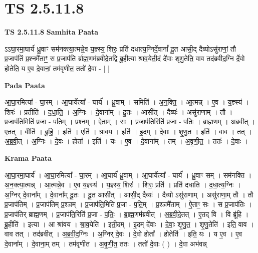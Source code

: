 \documentclass[17pt]{extarticle}
\begin{document}
\section{ TS 2.5.11.8 }

\textbf{TS 2.5.11.8 } \newline
\textbf{Samhita Paata} \newline

ऽऽघा॒रमा॒घार्य॑ ध्रु॒वाꣳ सम॑नक्त्या॒त्मन्ने॒व य॒ज्ञ्स्य॒ शिरः॒ प्रति॑ दधात्य॒ग्निर्दे॒वानां᳚ दू॒त आसी॒द् दैव्योऽसु॑राणां॒ तौ प्र॒जाप॑तिं प्र॒श्नमै॑ताꣳ॒॒ स प्र॒जाप॑ति र्ब्राह्म॒णम॑ब्रवीदे॒तद्वि ब्रू॒हीत्या श्रा॑व॒येती॒दं दे॑वाः शृणु॒तेति॒ वाव तद॑ब्रवीद॒ग्नि र्दे॒वो होतेति॒ य ए॒व दे॒वानां॒ तम॑वृणीत॒ ततो॑ दे॒वा - [  ] \newline

\textbf{Pada Paata} \newline

आ॒घा॒रमित्या᳚ - घा॒रम् । आ॒घार्येत्या᳚ - घार्य॑ । ध्रु॒वाम् । समिति॑ । अ॒न॒क्ति॒ । आ॒त्मन्न् । ए॒व । य॒ज्ञ्स्य॑ । शिरः॑ । प्रतीति॑ । द॒धा॒ति॒ । अ॒ग्निः । दे॒वाना᳚म् । दू॒तः । आसी᳚त् । दैव्यः॑ । असु॑राणाम् । तौ । प्र॒जाप॑ति॒मिति॑ प्र॒जा - प॒ति॒म् । प्र॒श्नम् । ऐ॒ता॒म् । सः । प्र॒जाप॑ति॒रिति॑ प्र॒जा - प॒तिः॒ । ब्रा॒ह्म॒णम् । अ॒ब्र॒वी॒त् । ए॒तत् । वीति॑ । ब्रू॒हि॒ । इति॑ । एति॑ । श्रा॒व॒य॒ । इति॑ । इ॒दम् । दे॒वाः॒ । शृ॒णु॒त॒ । इति॑ । वाव । तत् । अ॒ब्र॒वी॒त् । अ॒ग्निः । दे॒वः । होता᳚ । इति॑ । यः । ए॒व । दे॒वाना᳚म् । तम् । अ॒वृ॒णी॒त॒ । ततः॑ । दे॒वाः ।  \newline


\textbf{Krama Paata} \newline

आ॒घा॒रमा॒घार्य॑ । आ॒घा॒रमित्या᳚ - घा॒रम् । आ॒घार्य॑ ध्रु॒वाम् । आ॒घार्येत्या᳚ - घार्य॑ । ध्रु॒वाꣳ सम् । सम॑नक्ति । अ॒न॒क्त्या॒त्मन्न् । आ॒त्मन्ने॒व । ए॒व य॒ज्ञ्स्य॑ । य॒ज्ञ्स्य॒ शिरः॑ । शिरः॒ प्रति॑ । प्रति॑ दधाति । द॒धा॒त्य॒ग्निः । अ॒ग्निर् दे॒वाना᳚म् । दे॒वाना᳚म् दू॒तः । दू॒त आसी᳚त् । आसी॒द् दैव्यः॑ । दैव्यो ऽसु॑राणाम् । असु॑राणा॒म् तौ । तौ प्र॒जाप॑तिम् । प्र॒जाप॑तिम् प्र॒श्ञम् । प्र॒जाप॑ति॒मिति॑ प्र॒जा - प॒ति॒म् । प्र॒श्ञमै॑ताम् । ऐ॒ताꣳ॒॒ सः । स प्र॒जाप॑तिः । प्र॒जाप॑तिर् ब्राह्म॒णम् । प्र॒जाप॑ति॒रिति॑ प्र॒जा - प॒तिः॒ । ब्रा॒ह्म॒णम॑ब्रवीत् । अ॒ब्र॒वी॒दे॒तत् । ए॒तद् वि । वि ब्रू॑हि । ब्रू॒हीति॑ । इत्या । आ श्रा॑वय । श्रा॒व॒येति॑ । इती॒दम् । इ॒दम् दे॑वाः । दे॒वाः॒ शृ॒णु॒त॒ । शृ॒णु॒तेति॑ । इति॒ वाव । वाव तत् । तद॑ब्रवीत् । अ॒ब्र॒वी॒द॒ग्निः । अ॒ग्निर् दे॒वः । दे॒वो होता᳚ । होतेति॑ । इति॒ यः । य ए॒व । ए॒व दे॒वाना᳚म् । दे॒वाना॒म् तम् । तम॑वृणीत । अ॒वृ॒णी॒त॒ ततः॑ । ततो॑ दे॒वाः ( ) । दे॒वा अभ॑वन्न् \newline
\end{document}
